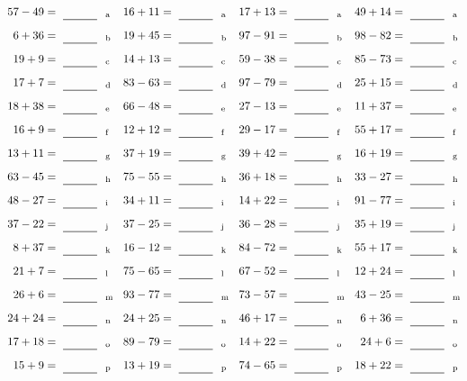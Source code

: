 \documentclass
[
  draft    = true,
  fontsize = 11pt,
  parskip  = half-
]
{scrartcl}
\begin{document}
\clearpage
\begin{align*}
    \pline{57-49}&=\rline{a}
  & \pline{16+11}&=\rline{a}
  & \pline{17+13}&=\rline{a}
  & \pline{49+14}&=\rline{a} \\[1ex]
    \pline{6+36}&=\rline{b}
  & \pline{19+45}&=\rline{b}
  & \pline{97-91}&=\rline{b}
  & \pline{98-82}&=\rline{b} \\[1ex]
    \pline{19+9}&=\rline{c}
  & \pline{14+13}&=\rline{c}
  & \pline{59-38}&=\rline{c}
  & \pline{85-73}&=\rline{c} \\[1ex]
    \pline{17+7}&=\rline{d}
  & \pline{83-63}&=\rline{d}
  & \pline{97-79}&=\rline{d}
  & \pline{25+15}&=\rline{d} \\[1ex]
    \pline{18+38}&=\rline{e}
  & \pline{66-48}&=\rline{e}
  & \pline{27-13}&=\rline{e}
  & \pline{11+37}&=\rline{e} \\[1ex]
    \pline{16+9}&=\rline{f}
  & \pline{12+12}&=\rline{f}
  & \pline{29-17}&=\rline{f}
  & \pline{55+17}&=\rline{f} \\[1ex]
    \pline{13+11}&=\rline{g}
  & \pline{37+19}&=\rline{g}
  & \pline{39+42}&=\rline{g}
  & \pline{16+19}&=\rline{g} \\[1ex]
    \pline{63-45}&=\rline{h}
  & \pline{75-55}&=\rline{h}
  & \pline{36+18}&=\rline{h}
  & \pline{33-27}&=\rline{h} \\[1ex]
    \pline{48-27}&=\rline{i}
  & \pline{34+11}&=\rline{i}
  & \pline{14+22}&=\rline{i}
  & \pline{91-77}&=\rline{i} \\[1ex]
    \pline{37-22}&=\rline{j}
  & \pline{37-25}&=\rline{j}
  & \pline{36-28}&=\rline{j}
  & \pline{35+19}&=\rline{j} \\[1ex]
    \pline{8+37}&=\rline{k}
  & \pline{16-12}&=\rline{k}
  & \pline{84-72}&=\rline{k}
  & \pline{55+17}&=\rline{k} \\[1ex]
    \pline{21+7}&=\rline{l}
  & \pline{75-65}&=\rline{l}
  & \pline{67-52}&=\rline{l}
  & \pline{12+24}&=\rline{l} \\[1ex]
    \pline{26+6}&=\rline{m}
  & \pline{93-77}&=\rline{m}
  & \pline{73-57}&=\rline{m}
  & \pline{43-25}&=\rline{m} \\[1ex]
    \pline{24+24}&=\rline{n}
  & \pline{24+25}&=\rline{n}
  & \pline{46+17}&=\rline{n}
  & \pline{6+36}&=\rline{n} \\[1ex]
    \pline{17+18}&=\rline{o}
  & \pline{89-79}&=\rline{o}
  & \pline{14+22}&=\rline{o}
  & \pline{24+6}&=\rline{o} \\[1ex]
    \pline{15+9}&=\rline{p}
  & \pline{13+19}&=\rline{p}
  & \pline{74-65}&=\rline{p}
  & \pline{18+22}&=\rline{p}
\end{align*}
\end{document}
